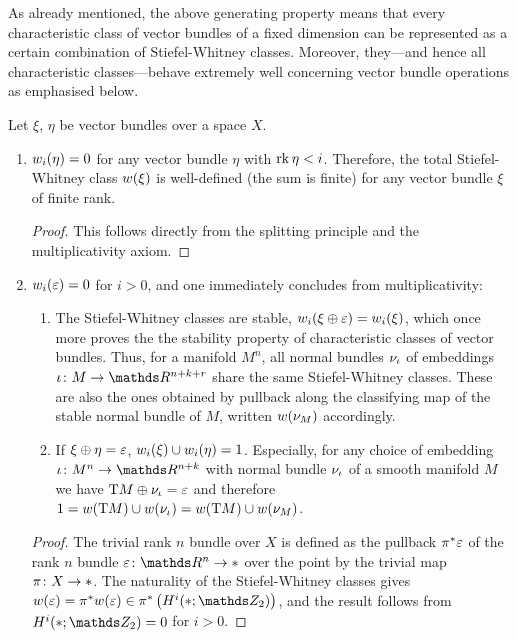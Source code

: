 As already mentioned, the above generating property means that every
characteristic class of vector bundles of a fixed dimension can be
represented as a certain combination of Stiefel-Whitney classes.
Moreover, they---and hence all characteristic classes---behave
extremely well concerning vector bundle operations as emphasised
below.
\begin{Rem}
  \label{rem:propswclasses}
  Let $\xi$, $\eta$ be vector bundles over a space $X$.
  \begin{enumerate} 
  \item\label{item:propswclasses:dimesioncut} ${w_{i}}(\eta) = 0$
    for any vector bundle $\eta$ with $\operatorname{rk}\eta < i$.
    Therefore, the total Stiefel-Whitney class ${w}(\xi)$ is
    well-defined (\idest the sum is finite)
    for any vector bundle $\xi$ of finite rank.
    \begin{proof}
      This follows directly from the splitting principle and
      the multiplicativity axiom.
    \end{proof}
  \item\label{item:swoftrivbdl} ${w_{i}}(\varepsilon)=0$ for $i>0$, and one immediately concludes
    from multiplicativity:
    \begin{enumerate}
    \item\label{item:swclassesstable}
      The Stiefel-Whitney classes are stable, \idest
      ${w_{i}}(\xi\oplus\varepsilon) = {w_{i}}(\xi)$, which once more proves
      the the stability property of characteristic classes of vector bundles.
      Thus, for a manifold $M^n$, all normal bundles $\nu_{{\iota}}$ of
      embeddings $\emb\colon M\to\R^{n+k+r}$ share the same
      Stiefel-Whitney classes. These are also the ones obtained by
      pullback along the classifying map of the stable normal bundle
      of $M$, written ${w}(\nu_{M})$ accordingly.
    \item\label{item:wuclassmfdinverse}
      If $\xi\oplus\eta = \varepsilon$, ${w_{i}}(\xi)\cup{w_{i}}(\eta)=1$.
      Especially, for any choice of embedding $\emb\colon M^n\to\R^{n+k}$
      with normal bundle $\nu_{{\iota}}$ of a smooth manifold $M$ we have
      $\mathrm{T}M\oplus\nu_{{\iota}} = \varepsilon$ and therefore
      $1 = {w}(\mathrm{T}M) \cup {w}(\nu_{{\iota}}) = {w}(\mathrm{T}M)\cup{w}(\nu_{M})$.
    \end{enumerate}
    \begin{proof}
      The trivial rank $n$ bundle over $X$ is defined as the pullback
      ${\pi}^* \varepsilon$ of the rank $n$ bundle
      $\trivbdl\colon \R^n\to\pt$ over the point by the trivial map
      $\pi\colon X\to*$. The naturality of the Stiefel-Whitney
      classes gives $\W{\trivbdl} = \pb\pi \W{\trivbdl}
      \in\pb\pi \left(\H^i(\pt;\Zmod2)\right)$,
      and the result follows from $\H^i(\pt;\Zmod2) = 0$ for $i>0$.
    \end{proof}
  \end{enumerate}
\end{Rem}

